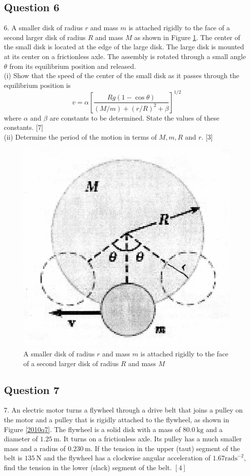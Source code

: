 \documentclass{article}
\begin{document}
\subsection{Question 6}
6. A smaller disk of radius $r$ and mass $m$ is attached rigidly to the face of a second larger disk of radius $R$ and mass $M$ as shown in Figure \ref{2010q6}. The center of the small disk is located at the edge of the large disk. The large disk is mounted at its center on a frictionless axle. The assembly is rotated through a small angle $\theta$ from its equilibrium position and released. \\
(i) Show that the speed of the center of the small disk as it passes through the equilibrium position is
$$
v=\alpha\left[\frac{R g(1-\cos \theta)}{(M / m)+(r / R)^{2}+\beta}\right]^{1 / 2}
$$
where $\alpha$ and $\beta$ are constants to be determined. State the values of these constants. [7]\\
(ii) Determine the period of the motion in terms of $M, m, R$ and $r$. [3]
\begin{figure}
	\centering
	\includegraphics[width=0.5\linewidth]{spho_book_TYS_images/2010q6.png}
	\caption{A smaller disk of radius $r$ and mass $m$ is attached rigidly to the face of a second larger disk of radius $R$ and mass $M$}\label{2010q6}
\end{figure}

\subsection{Question 7}
7. An electric motor turns a flywheel through a drive belt that joins a pulley on the motor and a pulley that is rigidly attached to the flywheel, as shown in Figure \ref{2010q7}. The flywheel is a solid disk with a mass of $80.0 \mathrm{~kg}$ and a diameter of $1.25 \mathrm{~m}$. It turns on a frictionless axle. Its pulley has a much smaller mass and a radius of $0.230 \mathrm{~m}$. If the tension in the upper (taut) segment of the belt is $135 \mathrm{~N}$ and the flywheel has a clockwise angular acceleration of $1.67 \mathrm{rads}^{-2}$, find the tension in the lower (slack) segment of the belt.
$[4]$
\end{document}

